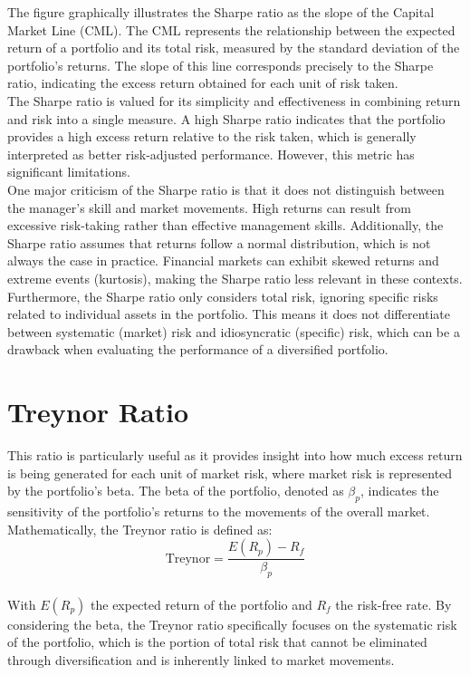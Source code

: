 \documentclass[a4paper,10pt]{article}
\begin{document}
\noindent The  figure graphically illustrates the Sharpe ratio as the slope of the Capital Market Line (CML). The CML represents the relationship between the expected return of a portfolio and its total risk, measured by the standard deviation of the portfolio's returns. The slope of this line corresponds precisely to the Sharpe ratio, indicating the excess return obtained for each unit of risk taken. \\

\noindent The Sharpe ratio is valued for its simplicity and effectiveness in combining return and risk into a single measure. A high Sharpe ratio indicates that the portfolio provides a high excess return relative to the risk taken, which is generally interpreted as better risk-adjusted performance. However, this metric has significant limitations. \\

\noindent One major criticism of the Sharpe ratio is that it does not distinguish between the manager's skill and market movements. High returns can result from excessive risk-taking rather than effective management skills. Additionally, the Sharpe ratio assumes that returns follow a normal distribution, which is not always the case in practice. Financial markets can exhibit skewed returns and extreme events (kurtosis), making the Sharpe ratio less relevant in these contexts. \\

\noindent Furthermore, the Sharpe ratio only considers total risk, ignoring specific risks related to individual assets in the portfolio. This means it does not differentiate between systematic (market) risk and idiosyncratic (specific) risk, which can be a drawback when evaluating the performance of a diversified portfolio. \\

\section*{Treynor Ratio}

\noindent This ratio is particularly useful as it provides insight into how much excess return is being generated for each unit of market risk, where market risk is represented by the portfolio's beta. The beta of the portfolio, denoted as \(\beta_p\), indicates the sensitivity of the portfolio's returns to the movements of the overall market. \\

\noindent Mathematically, the Treynor ratio is defined as: \\
\[
\text{Treynor} = \frac{E(R_p) - R_f}{\beta_p}
\] \\
\noindent With \(E(R_p)\) the expected return of the portfolio and \(R_f\) the risk-free rate. By considering the beta, the Treynor ratio specifically focuses on the systematic risk of the portfolio, which is the portion of total risk that cannot be eliminated through diversification and is inherently linked to market movements. \\
\end{document}

